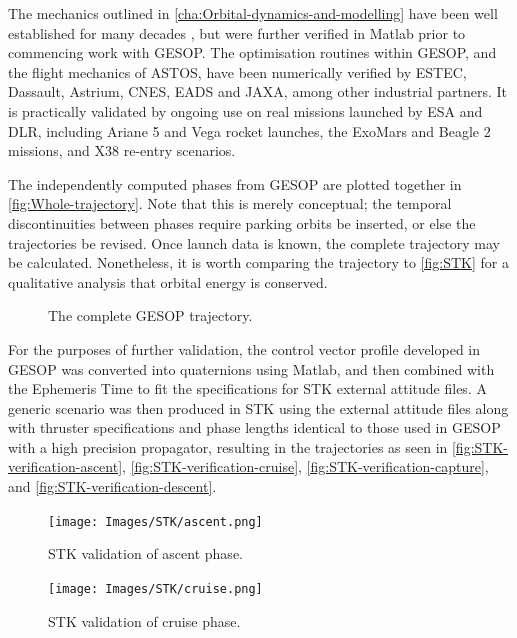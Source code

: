 The mechanics outlined in \autoref{cha:Orbital-dynamics-and-modelling} have been well established for many decades \parencite{Kaplan1976}, but were further verified in Matlab prior to commencing work with GESOP. The optimisation routines within GESOP, and the flight mechanics of ASTOS, have been numerically verified by ESTEC, Dassault, Astrium, CNES, EADS and JAXA, among other industrial partners. It is practically validated by ongoing use on real missions launched by ESA and DLR, including Ariane 5 and Vega rocket launches, the ExoMars and Beagle 2 missions, and X38 re-entry scenarios.

The independently computed phases from GESOP are plotted together in \autoref{fig:Whole-trajectory}. Note that this is merely conceptual; the temporal discontinuities between phases require parking orbits be inserted, or else the trajectories be revised. Once launch data is known, the complete trajectory may be calculated. Nonetheless, it is worth comparing the trajectory to \autoref{fig:STK} for a qualitative analysis that orbital energy is conserved.

\begin{figure}
\centering
\def\svgwidth{0.8\textwidth}

\caption{The complete GESOP trajectory.} \label{fig:Whole-trajectory}
\end{figure}

For the purposes of further validation, the control vector profile developed in GESOP was converted into quaternions using Matlab, and then combined with the Ephemeris Time to fit the specifications for STK external attitude files. A generic scenario was then produced in STK using the external attitude files along with thruster specifications and phase lengths identical to those used in GESOP with a high precision propagator, resulting in the trajectories as seen in \autoref{fig:STK-verification-ascent}, \autoref{fig:STK-verification-cruise}, \autoref{fig:STK-verification-capture}, and \autoref{fig:STK-verification-descent}.

\begin{figure}
\centering
\texttt{[image: Images/STK/ascent.png]}
\caption{STK validation of ascent phase.} \label{fig:STK-verification-ascent}
\end{figure}


\begin{figure}
\centering
\texttt{[image: Images/STK/cruise.png]}
\caption{STK validation of cruise phase.} \label{fig:STK-verification-cruise}
\end{figure}


